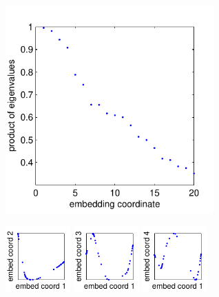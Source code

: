 \documentclass[10pt]{article}
\begin{document}
\centering

\noindent
\includegraphics[width=8cm]{drosophila_live_eval_spectrum}

\noindent
\includegraphics[width=2.5cm]{drosophila_live_evec_corr1}
\includegraphics[width=2.5cm]{drosophila_live_evec_corr2}
\includegraphics[width=2.5cm]{drosophila_live_evec_corr3}
\end{document}
